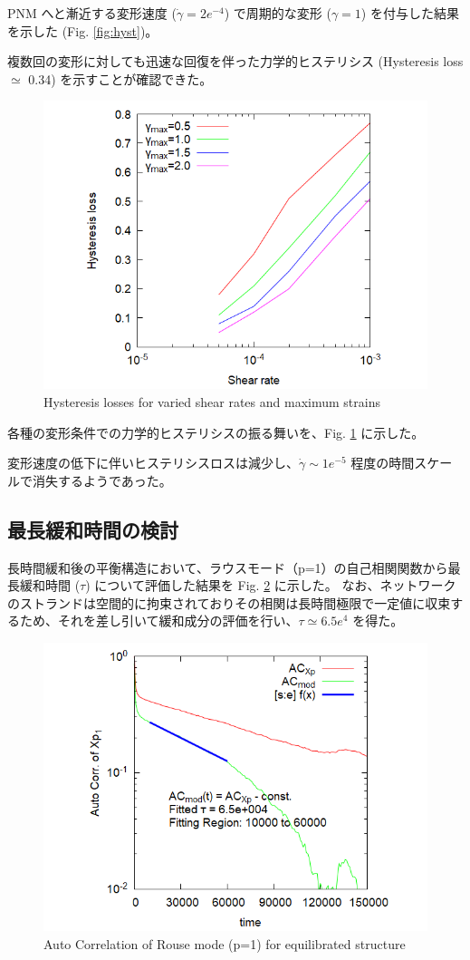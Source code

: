 \documentclass[uplatex,10pt,a4paper,twocolumn]{jsarticle}
\begin{document}
PNM へと漸近する変形速度 ($\dot{\gamma} = 2e^{-4}$) で周期的な変形 ($\gamma = 1$) を付与した結果を示した (Fig. \ref{fig:hyst})。

複数回の変形に対しても迅速な回復を伴った力学的ヒステリシス (Hysteresis loss $\simeq$ 0.34) を示すことが確認できた。

\vspace{-2mm}
\begin{figure}[htb]
\centering
	\includegraphics[width=.42\textwidth]{hyst_shear.png}
\caption{Hysteresis losses for varied shear rates and maximum strains}
\label{fig:hystloss}
\end{figure}
\vspace{-5mm}

各種の変形条件での力学的ヒステリシスの振る舞いを、Fig. \ref{fig:hystloss} に示した。

変形速度の低下に伴いヒステリシスロスは減少し、$\dot{\gamma} \sim 1e^{-5}$ 程度の時間スケールで消失するようであった。

\subsection{最長緩和時間の検討}

長時間緩和後の平衡構造において、ラウスモード（p=1）の自己相関関数から最長緩和時間 ($\tau$) について評価した結果を Fig. \ref{fig:ac-xp} に示した。
なお、ネットワークのストランドは空間的に拘束されておりその相関は長時間極限で一定値に収束するため、それを差し引いて緩和成分の評価を行い、$\tau \simeq 6.5e^{4}$ を得た。
\vspace{-1mm}
\begin{figure}[htb]
\centering
	\includegraphics[width=.42\textwidth]{Xp_1_org.png}
\caption{Auto Correlation of Rouse mode (p=1) for equilibrated structure}
\label{fig:ac-xp}
\end{figure}
\vspace{-5mm}
\end{document}

